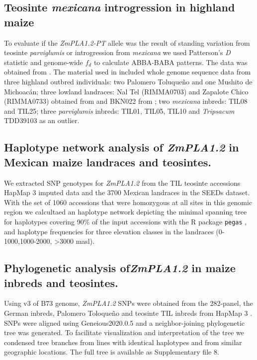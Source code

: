 \documentclass[9pt,twocolumn,twoside,lineno]{BioRxiv}
\def\code#1{\texttt{#1}}
\begin{document}
\subsection{Teosinte \textit{mexicana} introgression in highland maize}
To evaluate if the \textit{ZmPLA1.2-PT} allele was the result of standing variation from teosinte \textit{parviglumis} or introgression from \textit{mexicana} we used Patterson's \textit{D} statistic and genome-wide $f_{d}$ to calculate ABBA-BABA patterns. 
The data was obtained from \cite{Gonzalez-Segovia2019-jy}. 
The material used in \cite{Gonzalez-Segovia2019-jy} included whole genome sequence data from three highland outbred individuals: two Palomero Toluqueño and one Mushito de Michoacán; three lowland landraces: Nal Tel (RIMMA0703) and Zapalote Chico (RIMMA0733) obtained from \cite{Wang2017-bc} and  BKN022 from \cite{Bukowski2017-ng}; two \textit{mexicana} inbreds: TIL08 and TIL25; three \textit{parviglumis} inbreds: TIL01, TIL05, TIL10 and \textit{Tripsacum} TDD39103 \cite{Bukowski2017-ng} as an outlier. 

\subsection{Haplotype network analysis of \textit{ZmPLA1.2} in Mexican maize landraces and teosintes.}
We extracted SNP genotypes for \textit{ZmPLA1.2} from the TIL teosinte accessions HapMap 3 imputed data \cite{Bukowski2017-ng} and the 3700 Mexican landraces in the SEEDs dataset. 
With the set of 1060 accessions that were homozygous at all sites in this genomic region we calcultaed an haplotype network depicting the minimal spanning tree for haplotypes covering 90\% of the input accessions with the R package \code{pegas} \cite{paradis2010}, and haplotype frequencies for three elevation classes in the landraces (0-1000,1000-2000, >3000 masl).

\subsection{Phylogenetic analysis of\textit{ZmPLA1.2} in maize inbreds and teosintes.}
Using v3 of B73 genome, \textit{ZmPLA1.2} SNPs were obtained from the 282-panel, the German inbreds, Palomero Toloqueño and teosinte TIL inbreds from HapMap 3 \cite{Bukowski2017-ng}. 
SNPs were aligned using Geneious2020.0.5 and a neighbor-joining phylogenetic tree was generated. 
To facilitate visualization and interpretation of the tree we condensed tree branches from lines with identical haplotypes and from similar geographic locations. 
The full tree is available as Supplementary file 8. 
\end{document}
